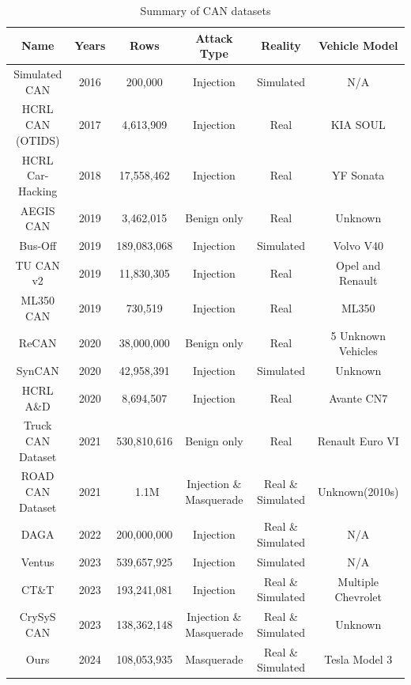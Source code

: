 \documentclass[lettersize,journal]{IEEEtran}
\begin{document}
\begin{table}[htbp]
\caption{Summary of CAN datasets}
\label{tab2}
\begin{center}
\renewcommand{\arraystretch}{1.2} %
\small
\begin{tabular}{cccccc}
\hline
\textbf{Name} & \textbf{Years} & \textbf{Rows} & \textbf{Attack Type} & \textbf{Reality} & \textbf{Vehicle Model} \\
\hline
Simulated CAN\cite{b19} & 2016 & 200,000 & Injection & Simulated & N/A \\
HCRL CAN (OTIDS)\cite{b20} & 2017 & 4,613,909 & Injection & Real & KIA SOUL \\
HCRL Car-Hacking\cite{b21} & 2018 & 17,558,462 & Injection & Real & YF Sonata \\
AEGIS CAN\cite{b22} & 2019 & 3,462,015 & Benign only & Real & Unknown \\
Bus-Off\cite{b23} & 2019 & 189,083,068 & Injection & Simulated & Volvo V40 \\
TU CAN v2\cite{b24} & 2019 & 11,830,305 & Injection & Real & Opel and Renault \\
ML350 CAN\cite{b25} & 2019 & 730,519 & Injection & Real & ML350 \\
ReCAN\cite{b26} & 2020 & 38,000,000 & Benign only & Real & 5 Unknown Vehicles  \\
SynCAN\cite{b27} & 2020 & 42,958,391 & Injection & Simulated & Unknown \\
HCRL A\&D\cite{b29} & 2020 & 8,694,507 & Injection & Real & Avante CN7 \\
Truck CAN Dataset\cite{b30} & 2021 & 530,810,616 & Benign only & Real & Renault Euro VI \\
ROAD CAN Dataset\cite{b34} & 2021 & ~1.1M & Injection \& Masquerade & Real \& Simulated & Unknown(2010s) \\
DAGA\cite{b31} & 2022 & 200,000,000 & Injection & Real \& Simulated & N/A \\
Ventus\cite{b32} & 2023 & 539,657,925 & Injection & Simulated & N/A \\
CT\&T\cite{b28} & 2023 & 193,241,081 & Injection & Real \& Simulated & Multiple Chevrolet \\
CrySyS CAN\cite{b33} & 2023 & 138,362,148 & Injection \& Masquerade & Real \& Simulated & Unknown \\
Ours & 2024 & 108,053,935 & Masquerade & Real \& Simulated & Tesla Model 3 \\
\hline
\end{tabular}
\end{center}
\end{table}
\end{document}
